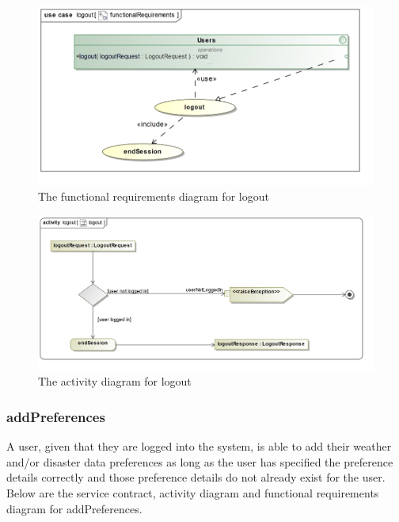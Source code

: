 \begin{figure}[H]
	\centering
	\includegraphics[width=1.1\textwidth]{../images/funcReq/logoutFunctionalRequirements.jpg}
	\caption{The functional requirements diagram for logout \label{overflow}}
\end{figure}

\begin{figure}[H]
	\centering
	\includegraphics[scale=0.22]{../images/funcReq/logoutActivityDiagram.jpg}
	\caption{The activity diagram for logout \label{overflow}}
\end{figure}

\subsubsection{addPreferences}

A user, given that they are logged into the system, is able to add their weather and/or disaster data preferences as long as the user has specified the preference details correctly and those preference details do not already exist for the user. Below are the service contract, activity diagram and functional requirements diagram for addPreferences.


